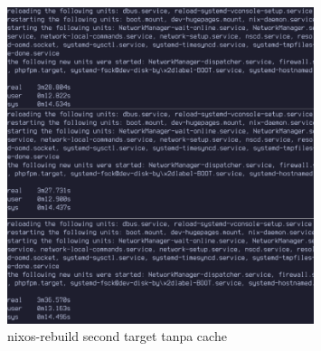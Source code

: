 \documentclass[10pt,]{report}
\begin{document}
\begin{adjustwidth}{20pt}{}
\begin{adjustwidth}{20pt}{}
\begin{figure}[H]
\begin{center}
				\includegraphics[width=0.8\textwidth]{images/nix-target/nix-pasca-install-26-com.png}
			\end{center}
			\caption{nixos-rebuild second target tanpa cache}
		\end{figure}


\end{adjustwidth}
\end{adjustwidth}
\end{document}
